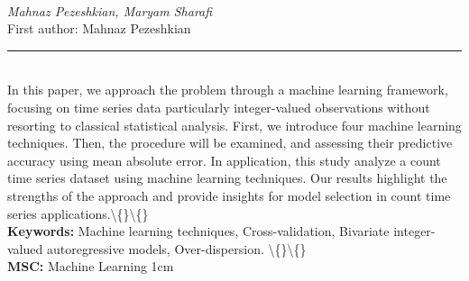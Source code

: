 \documentclass[10pt,twoside]{article}
\begin{document}
\noindent\begin{minipage}[t][\textheight]{\textwidth}
\\[0.35em]
{\itshape Mahnaz Pezeshkian, Maryam Sharafi}\\[0.2em]
{\footnotesize First author: Mahnaz Pezeshkian}\\[0.45em]
\noindent\rule{\textwidth}{0.3pt}\\[0.4em]
{\footnotesize  In this paper, we approach the problem through a machine learning framework, focusing on time series data particularly integer-valued observations without resorting to classical statistical analysis. First, we introduce four machine learning techniques. Then, the procedure will be examined, and assessing their predictive accuracy using mean absolute error. In application, this study analyze a count time series dataset using machine learning techniques. Our results highlight the strengths of the approach and provide insights for model selection in count time series applications.\textbackslash\{\}\textbackslash\{\}}\\[0.4em]
{\footnotesize\bfseries Keywords:} {\footnotesize Machine learning techniques, Cross-validation, Bivariate integer-valued autoregressive models, Over-dispersion. \textbackslash\{\}\textbackslash\{\}}\\[0.15em]
{\footnotesize\bfseries MSC:} {\footnotesize Machine Learning 1cm}\\
\vfill
\end{minipage}
\newpage
\end{document}
